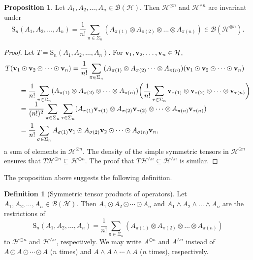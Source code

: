 \documentclass[10pt,reqno]{amsart}
\newcommand{\0}{{\color{lightgray}0}}
\renewcommand{\S}{\mathrm{S}}
\newcommand{\B}{\mathcal{B}}
\newcommand{\h}{\mathcal{H}}
\renewcommand{\vec}[1]{{\bf #1}}
\theoremstyle{definition}
\newtheorem{Proposition}[equation]{Proposition}
\newtheorem{Definition}[equation]{Definition}
\numberwithin{equation}{section}
\begin{document}
\begin{Proposition}\label{Proposition:Invariant}
Let $A_1, A_2,  \ldots, A_n \in \B(\h)$.  Then $\h^{\odot n}$ and $\h^{\wedge n}$ are invariant under
\begin{equation*}
\S_n(A_1,A_2,\ldots,A_n) = 
    \frac{1}{n!}\sum_{\pi\in \Sigma_n} (A_{\pi(1)} \otimes A_{\pi(2)} \otimes \dots \otimes A_{\pi(n)}) \in \B(\h^{\otimes n}).
\end{equation*}
\end{Proposition}


\begin{proof}
Let $T = \S_n(A_1,A_2,\ldots,A_n)$.
For $\vec{v}_1, \vec{v}_2, \ldots, \vec{v}_n \in \h$,
\begin{align}
&T ( \vec{v}_1 \odot \vec{v}_2 \odot \cdots \odot \vec{v}_n ) 
= \frac{1}{n!}\sum_{\pi\in \Sigma_n}(A_{\pi(1)}  \otimes A_{\pi(2)}  \dots \otimes A_{\pi(n)})  (\vec{v}_1 \odot \vec{v}_2 \odot  \cdots \odot \vec{v}_n) \\
&\qquad= \frac{1}{n!}\sum_{\pi\in \Sigma_n}(A_{\pi(1)}  \otimes A_{\pi(2)} \otimes \dots \otimes A_{\pi(n)}) 
\bigg( \frac{1}{n !} \sum_{\tau \in \Sigma_{n}} \vec{v}_{\tau(1)}  \otimes \vec{v}_{\tau(2)} \otimes \cdots \otimes \vec{v}_{\tau(n)} \bigg) \\[-5pt]
&\qquad= \frac{1}{(n!)^2}\sum_{\pi\in \Sigma_n} \sum_{\tau \in \Sigma_{n}} (A_{\pi(1)}\vec{v}_{\tau(1)}  \otimes A_{\pi(2)}\vec{v}_{\tau(2)} \otimes  \dots \otimes A_{\pi(n)}\vec{v}_{\tau(n)}) \\
&\qquad= \frac{1}{n!}\sum_{\sigma\in \Sigma_n} A_{\sigma(1)}\vec{v}_{1}  \odot A_{\sigma(2)}\vec{v}_{2} \odot \dots \odot A_{\sigma(n)}\vec{v}_{n} ,
\end{align}
a sum of elements in $\h^{\odot n}$.  The density of the simple symmetric tensors in 
$\h^{\odot n}$ ensures that $T \h^{\odot n} \subseteq \h^{\odot n}$. 
The proof that $T \h^{\wedge n} \subseteq \h^{\wedge n}$ is similar. 
\end{proof}

The proposition above suggests the following definition.

\begin{Definition}[Symmetric tensor products of operators]
Let $A_1, A_2, \ldots, A_n \in \B(\h)$.  Then $A_1 \odot A_2 \odot \cdots \odot A_n$
and $A_1 \wedge A_2 \wedge \ldots \wedge A_n$ are the restrictions of 
\begin{equation*}
\S_n(A_1,A_2,\ldots,A_n) = \frac{1}{n!}\sum_{\pi\in \Sigma_n} (A_{\pi(1)} \otimes A_{\pi(2)} \otimes \dots \otimes A_{\pi(n)})
\end{equation*}
to $\h^{\odot n}$ and $\h^{\wedge n}$, respectively.
We may write $A^{\odot n}$ and $A^{\wedge n}$ instead of $A \odot A \odot \cdots \odot A$ 
($n$ times) and $A \wedge A \wedge \cdots \wedge A$ ($n$ times), respectively.
\end{Definition}
\end{document}
